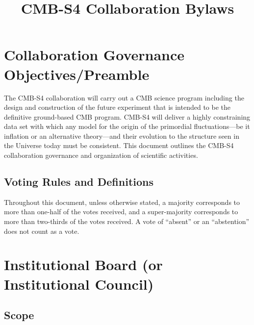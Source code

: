 \documentclass[12pt]{article}
\begin{document}
\title{CMB-S4 Collaboration Bylaws}
\maketitle

\tableofcontents

\section{Collaboration Governance Objectives/Preamble}
The CMB-S4 collaboration will carry out a CMB science program including the design and construction of the future experiment that is intended to be the definitive ground-based CMB program. CMB-S4 will deliver a highly constraining data set with which any model for the origin of the primordial fluctuations---be it inflation or an alternative theory---and their evolution to the structure seen in the Universe today must be consistent. This document outlines the CMB-S4 collaboration governance and organization of scientific activities.

\subsection{Voting Rules and Definitions}
Throughout this document, unless otherwise stated, a majority corresponds to more than one-half of the votes received, and a super-majority corresponds to more than two-thirds of the votes received. A vote of ``absent'' or an ``abstention'' does not count as a vote.

\section{Institutional Board (or Institutional Council)}

\subsection{Scope}
\end{document}
